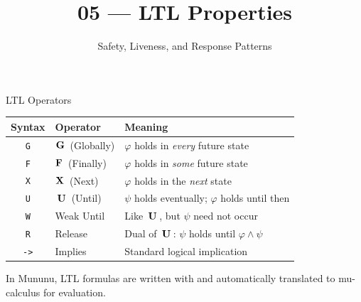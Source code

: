 

\title{05 --- LTL Properties}
\subtitle{Safety, Liveness, and Response Patterns}



\maketitle

\begin{frame}{LTL Operators}

\begin{center}
\begin{tabular}{@{}clp{6.5cm}@{}}
  \toprule
  \textbf{Syntax} & \textbf{Operator} & \textbf{Meaning} \\
  \midrule
  \texttt{G}  & $\mathbf{G}\,$  (Globally)  & $\varphi$ holds in \emph{every} future state \\
  \texttt{F}  & $\mathbf{F}\,$   (Finally)   & $\varphi$ holds in \emph{some} future state \\
  \texttt{X}  & $\mathbf{X}\,$      (Next)      & $\varphi$ holds in the \emph{next} state \\
  \texttt{U}  & $\,\mathbf{U}\,$     (Until)     & $\psi$ holds eventually; $\varphi$ holds until then \\
  \texttt{W}  & Weak Until  & Like $\,\mathbf{U}\,$, but $\psi$ need not occur \\
  \texttt{R}  & Release     & Dual of $\,\mathbf{U}\,$: $\psi$ holds until $\varphi \wedge \psi$ \\
  \texttt{->} & Implies     & Standard logical implication \\
  \bottomrule
\end{tabular}
\end{center}

\vspace{0.5em}
In Mununu, LTL formulas are written with  and
automatically translated to mu-calculus for evaluation.

\end{frame}

